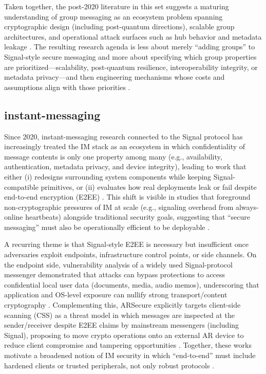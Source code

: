 Taken together, the post-2020 literature in this set suggests a maturing understanding of group messaging as an ecosystem problem spanning cryptographic design (including post-quantum directions), scalable group architectures, and operational attack surfaces such as hub behavior and metadata leakage \cite{bobrysheva2021,ayed2025,oppliger2024,sarvaiya2025,brigham2025}. The resulting research agenda is less about merely “adding groups” to Signal-style secure messaging and more about specifying which group properties are prioritized—scalability, post-quantum resilience, interoperability integrity, or metadata privacy—and then engineering mechanisms whose costs and assumptions align with those priorities \cite{oppliger2024,ayed2025,bobrysheva2021,sarvaiya2025,brigham2025}.

\subsection{instant-messaging}
Since 2020, instant-messaging research connected to the Signal protocol has increasingly treated the IM stack as an ecosystem in which confidentiality of message contents is only one property among many (e.g., availability, authentication, metadata privacy, and device integrity), leading to work that either (i) redesigns surrounding system components while keeping Signal-compatible primitives, or (ii) evaluates how real deployments leak or fail despite end-to-end encryption (E2EE) \cite{nelson2024,jain2021,bozorgi2023}. This shift is visible in studies that foreground non-cryptographic pressures of IM at scale (e.g., signaling overhead from always-online heartbeats) alongside traditional security goals, suggesting that “secure messaging” must also be operationally efficient to be deployable \cite{yi2020,thapa2025}.

A recurring theme is that Signal-style E2EE is necessary but insufficient once adversaries exploit endpoints, infrastructure control points, or side channels. On the endpoint side, vulnerability analysis of a widely used Signal-protocol messenger demonstrated that attacks can bypass protections to access confidential local user data (documents, media, audio memos), underscoring that application and OS-level exposure can nullify strong transport/content cryptography \cite{jain2021}. Complementing this, ARSecure explicitly targets client-side scanning (CSS) as a threat model in which messages are inspected at the sender/receiver despite E2EE claims by mainstream messengers (including Signal), proposing to move crypto operations onto an external AR device to reduce client compromise and tampering opportunities \cite{alsop2025}. Together, these works motivate a broadened notion of IM security in which “end-to-end” must include hardened clients or trusted peripherals, not only robust protocols \cite{jain2021,alsop2025}.

